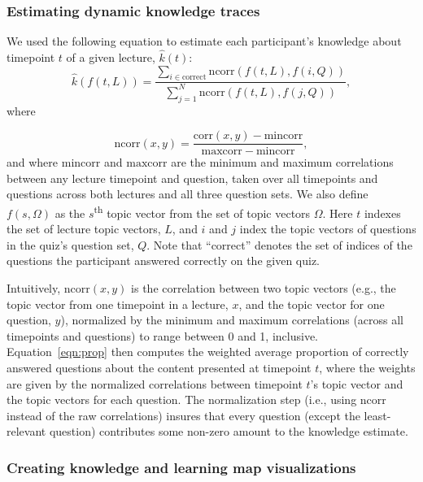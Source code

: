 \documentclass[10pt]{article}
\begin{document}
\subsubsection*{Estimating dynamic knowledge traces}

We used the following equation to estimate each participant's knowledge about
timepoint $t$ of a given lecture, $\hat{k}(t)$:
\begin{equation} 
    \hat{k}\left(f(t, L)\right) = \frac{\sum_{i \in \mathrm{correct}}\mathrm{ncorr}\left(f(t, L), f(i, Q)\right)}{\sum_{j = 1}^N \mathrm{ncorr}\left(f(t, L), f(j, Q)\right)},
    \label{eqn:prop}
\end{equation}
where 

\begin{equation} 
    \mathrm{ncorr}(x, y) = \frac{\mathrm{corr}(x, y) - \mathrm{mincorr}}{\mathrm{maxcorr} - \mathrm{mincorr}},
\end{equation} 
and where $\mathrm{mincorr}$ and $\mathrm{maxcorr}$ are the minimum and maximum
correlations between any lecture timepoint and question, taken over all
timepoints and questions across both lectures and all three question sets. We
also define $f(s, \Omega)$ as the $s$\textsuperscript{th} topic vector from the
set of topic vectors $\Omega$. Here $t$ indexes the set of lecture topic
vectors, $L$, and $i$ and $j$ index the topic vectors of questions in the
quiz's question set, $Q$. Note that ``correct'' denotes the set of indices of
the questions the participant answered correctly on the given quiz.

Intuitively, $\mathrm{ncorr}(x, y)$ is the correlation between two topic
vectors (e.g., the topic vector from one timepoint in a lecture, $x$, and the
topic vector for one question, $y$), normalized by the minimum and maximum
correlations (across all timepoints and questions) to range between 0 and 1,
inclusive. Equation~\ref{eqn:prop} then computes the weighted average
proportion of correctly answered questions about the content presented at
timepoint $t$, where the weights are given by the normalized correlations
between timepoint $t$'s topic vector and the topic vectors for each question.
The normalization step (i.e., using $\mathrm{ncorr}$ instead of the raw
correlations) insures that every question (except the least-relevant question)
contributes some non-zero amount to the knowledge estimate.

\subsubsection*{Creating knowledge and learning map visualizations}
\end{document}
